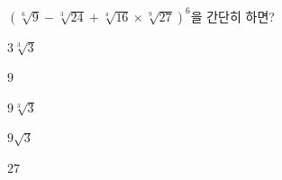 $(\sqrt[6]{9}-\sqrt[3]{24}+\sqrt[4]{16}\times\sqrt[9]{27})^6$을 간단히 하면?
\begin{choices32}{\rule[-3ex]{0pt}{8ex}$3\sqrt[3]{3}$}{\rule[-3ex]{0pt}{8ex}$9$}{\rule[-3ex]{0pt}{8ex}$9\sqrt[3]{3}$}{\rule[-3ex]{0pt}{8ex}$9\sqrt{3}$}{\rule[-3ex]{0pt}{8ex}$27$}\end{choices32}

